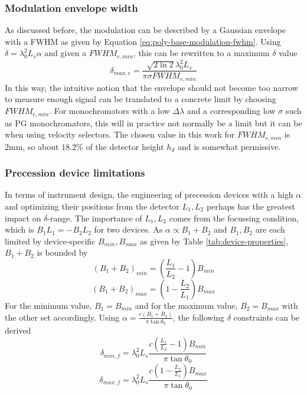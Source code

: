 \documentclass{article}
\begin{document}
\subsubsection{Modulation envelope width}
As discussed before, the modulation can be described by a Gaussian envelope with a FWHM as given by Equation \eqref{eq:poly-base-modulation-fwhm}. Using $\delta = \lambda_0^2L_s\alpha$ and given a $FWHM_{e,min}$, this can be rewritten to a maximum $\delta$ value
$$\delta_{max,e} = \frac{\sqrt{2\ln 2}\lambda_0^2 L_s}{\pi\sigma FWHM_{e,min}}$$
In this way, the intuitive notion that the envelope should not become too narrow to measure enough signal can be translated to a concrete limit by choosing $FWHM_{e,min}$. For monochromators with a low $\Delta\lambda$ and a corresponding low $\sigma$ such as PG monochromators, this will in practice not normally be a limit but it can be when using velocity selectors. The chosen value in this work for $FWHM_{e,min}$ is $2 \unit{\milli\meter}$, so about $18.2$\% of the detector height $h_d$ and is somewhat permissive.  

\subsubsection{Precession device limitations}
In terms of instrument design, the engineering of precession devices with a high $\alpha$ and optimizing their positions from the detector $L_1, L_2$ perhaps has the greatest impact on $\delta$-range. The importance of $L_1, L_2$ comes from the focussing condition, which is $B_1L_1 = -B_2L_2$ for two devices. As $\alpha\propto B_1 + B_2$ and $B_1, B_2$ are each limited by device-specific $B_{min}, B_{max}$ as given by Table \ref{tab:device-properties}, $B_1 + B_2$ is bounded by
$$(B_1 + B_2)_{min} = (\frac{L_1}{L_2} - 1)B_{min}$$
$$(B_1 + B_2)_{max} = (1 - \frac{L_2}{L_1})B_{max}$$
For the minimum value, $B_1 = B_{min}$ and for the maximum value, $B_2 = B_{max}$ with the other set accordingly. Using $\alpha = \frac{c(B_1+B_2)}{\pi\tan\theta_0}$, the following $\delta$ constraints can be derived
$$\delta_{min, f} = \lambda_0^2 L_s \frac{c(\frac{L_1}{L_2} - 1)B_{min}}{\pi\tan\theta_0}$$
$$\delta_{max, f} = \lambda_0^2 L_s \frac{c(1 - \frac{L_2}{L_1})B_{max}}{\pi\tan\theta_0}$$
\end{document}
